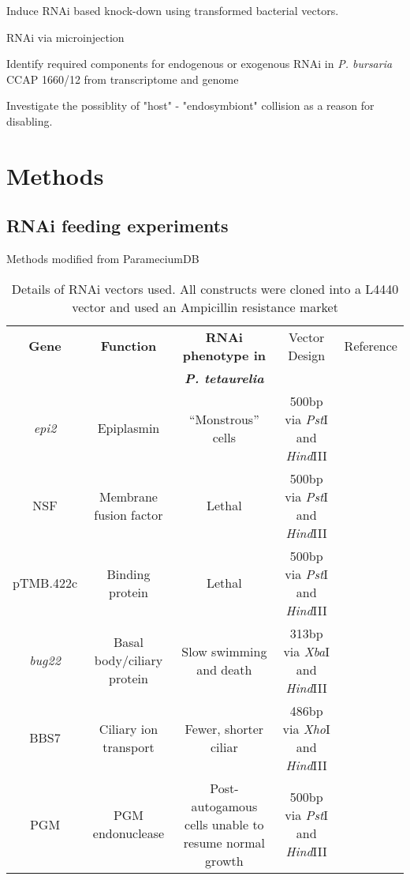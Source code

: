 Induce RNAi based knock-down using transformed bacterial vectors.

RNAi via microinjection

Identify required components for endogenous or exogenous RNAi in \textit{P. bursaria} CCAP 1660/12 from transcriptome and genome

Investigate the possiblity of "host" - "endosymbiont" collision as a reason for disabling.


\section{Methods}

\subsection{RNAi feeding experiments}

Methods modified from ParameciumDB 

\begin{table}
    \begin{tabular}{|c|c|c|c|c|}
        \hline
    \textbf{Gene} & \textbf{Function} & \textbf{RNAi phenotype in}      & Vector Design & Reference \\
                  &                   & \textbf{\textit{P. tetaurelia}} &               &           \\
        \hline
        \textit{epi2} & Epiplasmin & ``Monstrous'' cells  & 500bp via \textit{Pst}I and \textit{Hind}III & \citep{Damaj2009} \\
        NSF & Membrane fusion factor & Lethal & 500bp via \textit{Pst}I and \textit{Hind}III & \citep{Galvani2002} \\
        pTMB.422c & Binding protein & Lethal & 500bp via \textit{Pst}I and \textit{Hind}III & \citep{Nowack2011} \\
        \textit{bug22} & Basal body/ciliary protein & Slow swimming and death & 313bp via \textit{Xba}I and \textit{Hind}III & \citep{Laligne2010} \\
        BBS7 & Ciliary ion transport & Fewer, shorter ciliar & 486bp via \textit{Xho}I and \textit{Hind}III & \citep{Valentine2012} \\
        PGM & PGM endonuclease & Post-autogamous cells unable to resume normal growth & 500bp via \textit{Pst}I and \textit{Hind}III & \citep{Baudry2009} \\
        \hline
    \end{tabular}
    \caption{Details of RNAi vectors used.  All constructs were cloned into a L4440 vector and used an Ampicillin resistance market}
    \label{tab:rnai_vecs}
\end{table}

